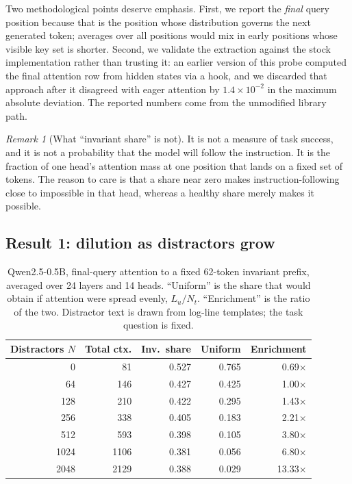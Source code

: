 \documentclass[11pt,a4paper]{article}
\theoremstyle{plain}
\theoremstyle{definition}
\theoremstyle{remark}
\newtheorem{remark}{Remark}
\begin{document}
Two methodological points deserve emphasis. First, we report the
\emph{final} query position because that is the position whose distribution
governs the next generated token; averages over all positions would mix in
early positions whose visible key set is shorter. Second, we validate the
extraction against the stock implementation rather than trusting it: an earlier
version of this probe computed the final attention row from hidden states via a
hook, and we discarded that approach after it disagreed with eager attention by
$1.4\times10^{-2}$ in the maximum absolute deviation. The reported numbers come
from the unmodified library path.

\begin{remark}[What ``invariant share'' is not]
It is not a measure of task success, and it is not a probability that the model
will follow the instruction. It is the fraction of one head's attention mass at
one position that lands on a fixed set of tokens. The reason to care is that a
share near zero makes instruction-following close to impossible in that head,
whereas a healthy share merely makes it possible.
\end{remark}

\subsection{Result 1: dilution as distractors grow}

\begin{table}[ht]
\centering
\small
\begin{tabular}{rrrrr}
\toprule
\textbf{Distractors $N$} & \textbf{Total ctx.} & \textbf{Inv.\ share} & \textbf{Uniform} & \textbf{Enrichment} \\
\midrule
0    & 81   & 0.527 & 0.765 & 0.69$\times$ \\
64   & 146  & 0.427 & 0.425 & 1.00$\times$ \\
128  & 210  & 0.422 & 0.295 & 1.43$\times$ \\
256  & 338  & 0.405 & 0.183 & 2.21$\times$ \\
512  & 593  & 0.398 & 0.105 & 3.80$\times$ \\
1024 & 1106 & 0.381 & 0.056 & 6.80$\times$ \\
2048 & 2129 & 0.388 & 0.029 & 13.33$\times$ \\
\bottomrule
\end{tabular}
\caption{Qwen2.5-0.5B, final-query attention to a fixed 62-token invariant
prefix, averaged over 24 layers and 14 heads. ``Uniform'' is the share that
would obtain if attention were spread evenly, $L_u/N_t$. ``Enrichment'' is the
ratio of the two. Distractor text is drawn from log-line templates; the task
question is fixed.}
\label{tab:sweep}
\end{table}
\end{document}
